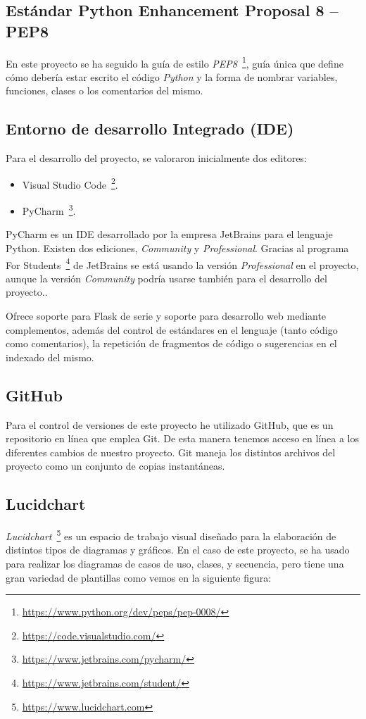 \subsection{Estándar Python Enhancement Proposal 8 -- PEP8}
En este proyecto se ha seguido la guía de estilo \textit{PEP8}~\footnote{\url{https://www.python.org/dev/peps/pep-0008/}}, guía única que define cómo debería estar escrito el código \textit{Python} y la forma de nombrar variables, funciones, clases o los comentarios del mismo.


\subsection{Entorno de desarrollo Integrado (IDE)}
Para el desarrollo del proyecto, se valoraron inicialmente dos editores:
\begin{itemize}	
	\item Visual Studio Code~\footnote{\url{https://code.visualstudio.com/}}.
	\item PyCharm~\footnote{\url{https://www.jetbrains.com/pycharm/}}.
\end{itemize}

PyCharm es un IDE desarrollado por la empresa JetBrains para el lenguaje Python. Existen dos ediciones, \textit{Community} y \textit{Professional}. Gracias al programa For Students~\footnote{\url{https://www.jetbrains.com/student/}} de JetBrains se está usando la versión \textit{Professional} en el proyecto, aunque la versión \textit{Community} podría usarse también para el desarrollo del proyecto..

Ofrece soporte para Flask de serie y soporte para desarrollo web mediante complementos, además del control de estándares en el lenguaje (tanto código como comentarios), la repetición de fragmentos de código o sugerencias en el indexado del mismo.



\subsection{GitHub}
Para el control de versiones de este proyecto he utilizado GitHub, que es un repositorio en línea que emplea Git. De esta manera tenemos acceso en línea a los diferentes cambios de nuestro proyecto.
Git maneja los distintos archivos del proyecto como un conjunto de copias instantáneas.

\subsection{Lucidchart}
\textit{Lucidchart}~\footnote{\url{https://www.lucidchart.com}} es un espacio de trabajo visual diseñado para la elaboración de distintos tipos de diagramas y gráficos. En el caso de este proyecto, se ha usado para realizar los diagramas de casos de uso, clases, y secuencia, pero tiene una gran variedad de plantillas como vemos en la siguiente figura:

